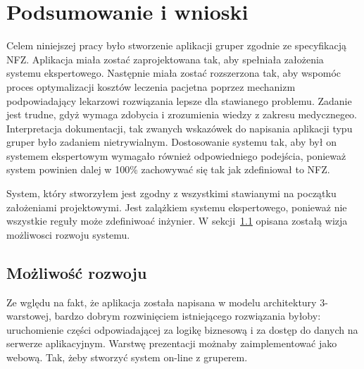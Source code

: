\chapter{Podsumowanie i wnioski}
\label{cha:podsumowanie}

Celem niniejszej pracy było stworzenie aplikacji gruper zgodnie ze specyfikacją NFZ. Aplikacja miała zostać zaprojektowana tak, aby spełniała założenia systemu ekspertowego. Następnie miała zostać rozszerzona tak, aby wspomóc proces optymalizacji kosztów leczenia pacjetna poprzez mechanizm podpowiadający lekarzowi rozwiązania lepsze dla stawianego problemu. Zadanie jest trudne, gdyż wymaga zdobycia i zrozumienia wiedzy z zakresu medycznegeo. Interpretacja dokumentacji, tak zwanych wskazówek do napisania aplikacji typu gruper było zadaniem nietrywialnym. Dostosowanie systemu tak, aby był on systemem ekspertowym wymagało również odpowiedniego podejścia, ponieważ system powinien dalej w 100\% zachowywać się tak jak zdefiniował to NFZ.

System, który stworzyłem jest zgodny z wszystkimi stawianymi na początku założeniami projektowymi. Jest zalążkiem systemu ekspertowego, ponieważ nie wszystkie reguły może zdefiniwoać inżynier. W sekcji~\ref{sec:mozliwoscRozwoju} opisana zostałą wizja możliwosci rozwoju systemu.


\section{Możliwość rozwoju}
\label{sec:mozliwoscRozwoju}

Ze wględu na fakt, że aplikacja została napisana w modelu architektury 3-warstowej, bardzo dobrym rozwinięciem istniejącego rozwiązania byłoby: uruchomienie części odpowiadającej za logikę biznesową i za dostęp do danych na serwerze aplikacyjnym. Warstwę prezentacji możnaby zaimplementować jako webową. Tak, żeby stworzyć system on-line z gruperem.

